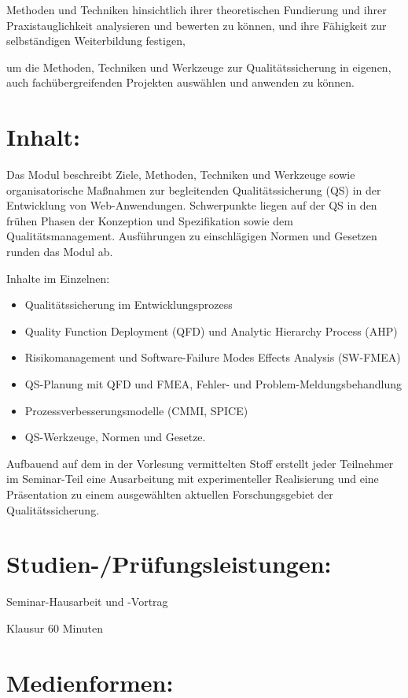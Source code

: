 Methoden und Techniken hinsichtlich ihrer theoretischen Fundierung und
ihrer Praxistauglichkeit analysieren und bewerten zu können, und ihre
Fähigkeit zur selbständigen Weiterbildung festigen,

um die Methoden, Techniken und Werkzeuge zur Qualitätssicherung in
eigenen, auch fachübergreifenden Projekten auswählen und anwenden zu
können.

\section*{Inhalt:}\label{inhalt-21}

Das Modul beschreibt Ziele, Methoden, Techniken und Werkzeuge sowie
organisatorische Maßnahmen zur begleitenden Qualitätssicherung (QS) in
der Entwicklung von Web-Anwendungen. Schwerpunkte liegen auf der QS in
den frühen Phasen der Konzeption und Spezifikation sowie dem
Qualitätsmanagement. Ausführungen zu einschlägigen Normen und Gesetzen
runden das Modul ab.

Inhalte im Einzelnen:

\begin{itemize}
\item
  Qualitätssicherung im Entwicklungsprozess
\item
  Quality Function Deployment (QFD) und Analytic Hierarchy Process (AHP)
\item
  Risikomanagement und Software-Failure Modes Effects Analysis (SW-FMEA)
\item
  QS-Planung mit QFD und FMEA, Fehler- und Problem-Meldungsbehandlung
\item
  Prozessverbesserungsmodelle (CMMI, SPICE)
\item
  QS-Werkzeuge, Normen und Gesetze.
\end{itemize}

Aufbauend auf dem in der Vorlesung vermittelten Stoff erstellt jeder
Teilnehmer im Seminar-Teil eine Ausarbeitung mit experimenteller
Realisierung und eine Präsentation zu einem ausgewählten aktuellen
Forschungsgebiet der Qualitätssicherung.

\section*{Studien-/Prüfungsleistungen:}\label{studien-pruxfcfungsleistungen-21}

Seminar-Hausarbeit und -Vortrag

Klausur 60 Minuten

\section*{Medienformen:}\label{medienformen-21}


